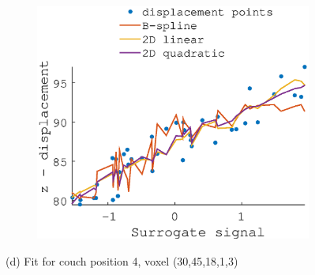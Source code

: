 \documentclass[11pt,a4paper,oneside]{report}
\begin{document}
\begin{figure}[H]
\begin{subfigure}[b]{0.33\textwidth}
  \end{subfigure}
    ~ %
  \begin{subfigure}[b]{0.33\textwidth}
    \includegraphics[width=\textwidth, trim=0 0 0 110,clip=true]{figures/task2/fit_round3_couch4.eps}
  \end{subfigure}
   (d) Fit for couch position 4, voxel (30,45,18,1,3)
  \vspace*{1em}


\end{figure}
\end{document}
